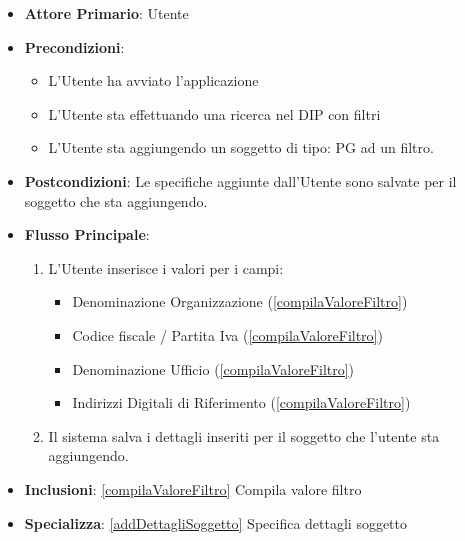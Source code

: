 \begin{itemize}
      \item \textbf{Attore Primario}: Utente
      \item \textbf{Precondizioni}: \begin{itemize}
            \item L'Utente ha avviato l'applicazione
            \item L'Utente sta effettuando una ricerca nel DIP con filtri
            \item L'Utente sta aggiungendo un soggetto di tipo: PG ad un filtro.
      \end{itemize}
      \item \textbf{Postcondizioni}:  Le specifiche aggiunte dall'Utente sono salvate per il soggetto che sta aggiungendo.
      \item \textbf{Flusso Principale}:
            \begin{enumerate}
                  \item L'Utente inserisce i valori per i campi:
                        \begin{itemize}
                              \item Denominazione Organizzazione (\ref{compilaValoreFiltro})
                              \item Codice fiscale / Partita Iva (\ref{compilaValoreFiltro})
                              \item Denominazione Ufficio (\ref{compilaValoreFiltro})
                              \item Indirizzi Digitali di Riferimento (\ref{compilaValoreFiltro})
                        \end{itemize}
                  \item Il sistema salva i dettagli inseriti per il soggetto che l'utente sta aggiungendo.
            \end{enumerate}
      \item \textbf{Inclusioni}: \ref{compilaValoreFiltro} Compila valore filtro
      \item \textbf{Specializza}: \ref{addDettagliSoggetto} Specifica dettagli soggetto
\end{itemize}

